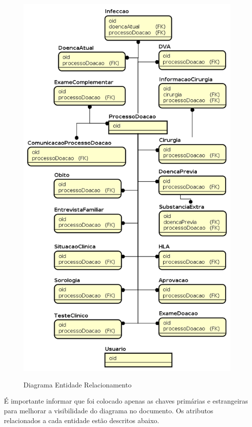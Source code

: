 \documentclass[portuguese,oneside]{tcc}
\begin{document}
\begin{figure}[htp]
\centering
\caption{Diagrama Entidade Relacionamento}
\includegraphics[scale=0.68]{er-diagram}
\label{fig:erDiagram}
\end{figure}

É importante informar que foi colocado apenas as chaves primárias e estrangeiras para melhorar a visibilidade do diagrama no documento. Os atributos relacionados a cada entidade estão descritos abaixo.
\end{document}
